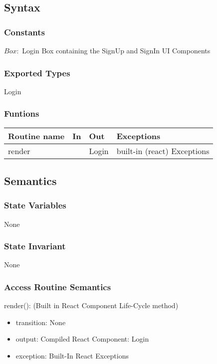 \documentclass[12pt, titlepage]{article}
\begin{document}
\subsection* {Syntax}

\subsubsection* {Constants} 
$Box:$ Login Box containing the SignUp and SignIn UI Components
\subsubsection* {Exported Types} Login
\subsubsection* {Funtions}
\begin{tabular}{| l | l | l | l |}
\hline
\textbf{Routine name} & \textbf{In} & \textbf{Out} & \textbf{Exceptions}\\
\hline
render & ~ & Login & built-in (react) Exceptions\\
\hline
\end{tabular}
\subsection* {Semantics}

\subsubsection* {State Variables}
None
\subsubsection* {State Invariant}
None

\subsubsection* {Access Routine Semantics}

render(): (Built in React Component Life-Cycle method)
\begin{itemize}
\item transition: None
\item output: Compiled React Component: Login
\item exception: Built-In React Exceptions
\end{itemize}
\newpage
\end{document}
